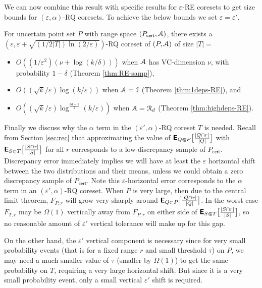 \documentclass[11pt]{myclass}
\newcommand{\eps}{\varepsilon}
\newcommand{\Eu}[1]{\ensuremath{\EuScript{#1}}}
\newcommand{\E}{\textbf{\textsf{E}}}
\newcommand{\cert}{\textsf{cert}}
\newcommand{\RE}{\textsf{RE}\xspace}
\newcommand{\RQ}{\textsf{RQ}\xspace}
\newcommand{\denselist}{\vspace{-.1in} \itemsep -2pt\parsep=-1pt\partopsep -2pt}
\begin{document}
We can now combine this result with specific results for $\eps$-\RE coresets to get size bounds for $(\eps,\alpha)$-\RQ coresets.  To achieve the below bounds we set $\eps = \eps'$.  


\begin{corollary}
For uncertain point set $P$ with range space $(P_\cert, \Eu{A})$, there exists a $(\eps, \eps + \sqrt{(1/2|T|) \ln(2/\eps)})$-RQ coreset of $(P,\Eu{A})$ of size $|T| = $
\begin{itemize} \denselist
\item $O((1/\eps^2) (\nu + \log(k/\delta)))$ when $\Eu{A}$ has VC-dimension $\nu$, with probability $1-\delta$ (Theorem \ref{thm:RE-samp}),
\item $O((\sqrt{k} /\eps) \log (k/\eps))$ when $\Eu{A} = \Eu{I}$ (Theorem \ref{thm:1deps-RE}), and
\item $O\left((\sqrt{k}/\eps) \log^{\frac{3d - 1}{2}} (k/\eps) \right)$ when $\Eu{A} = \Eu{R}_d$ (Theorem \ref{thm:highdeps-RE}).
\end{itemize}
\end{corollary}


Finally we discuss why the $\alpha$ term in the $(\eps',\alpha)$-\RQ coreset $T$ is needed.  
Recall from Section \ref{sec:rec} that approximating the value of $\E_{Q \Subset P} \big[ \frac{|Q \cap r|}{|Q|} \big]$  with $\E_{S \Subset T} \big[ \frac{|S \cap r|}{|S|} \big]$ for all $r$ corresponds to a low-discrepancy sample of $P_{\cert}$. Discrepancy error immediately implies we will have at least the $\eps$ horizontal shift between the two distributions and their means, unless we could obtain a zero discrepancy sample of $P_{\cert}$.  Note this $\eps$-horizontal error corresponds to the $\alpha$ term in an $(\eps',\alpha)$-\RQ coreset.  
When $P$ is very large, then due to the central limit theorem, $F_{P,r}$ will grow very sharply around $\E_{Q \Subset P} \big[ \frac{|Q \cap r|}{|Q|} \big]$.  
In the worst case $F_{T,r}$ may be $\Omega(1)$ vertically away from $F_{P,r}$ on either side of $\E_{S \Subset T} \big[ \frac{|S \cap r|}{|S|} \big]$, so no reasonable amount of $\eps'$ vertical tolerance will make up for this gap.  

On the other hand, the $\eps'$ vertical component is necessary since for very small probability events (that is for a fixed range $r$ and small threshold $\tau$) on $P$, we may need a much smaller value of $\tau$ (smaller by $\Omega(1)$) to get the same probability on $T$, requiring a very large horizontal shift.  But since it is a very small probability event, only a small vertical $\eps'$ shift is required.  
\end{document}
